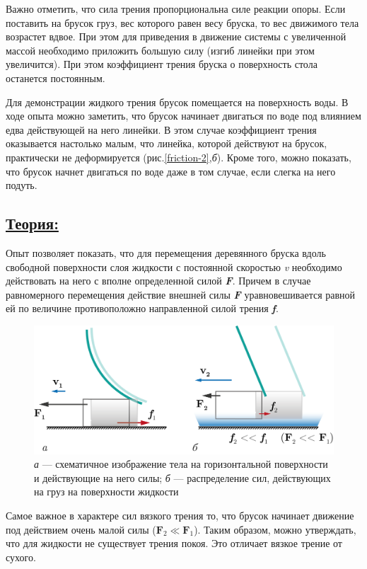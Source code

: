 \documentclass[14pt,a4paper,oneside]{extarticle}	%
\begin{document}
	Важно отметить, что сила трения пропорциональна силе реакции опоры.
	Если поставить на брусок груз, вес которого равен весу бруска, то вес движимого тела возрастет вдвое.
	При этом для приведения в движение системы с увеличенной массой необходимо приложить большую силу (изгиб линейки при этом увеличится).
	При этом коэффициент трения бруска о поверхность стола останется постоянным.
	


	Для демонстрации жидкого трения брусок помещается на поверхность воды.
	В ходе опыта можно заметить, что брусок начинает двигаться по воде под влиянием едва действующей на него линейки.
	В этом случае коэффициент трения оказывается настолько малым, что линейка, 
	которой действуют на брусок, практически не деформируется (рис.\ref{friction-2},\textit{б}).
	Кроме того, можно показать, что брусок начнет двигаться по воде даже в том случае, 
	если слегка на него подуть.
		
\subsection*{\underline{Теория:}}

Опыт позволяет показать, что для перемещения деревянного бруска вдоль свободной поверхности слоя жидкости с постоянной скоростью \textit{v} необходимо действовать на него с вполне определенной силой \textit{\textbf{F}}.
Причем в случае равномерного перемещения действие внешней силы \textit{\textbf{F}} уравновешивается равной ей по величине противоположно направленной силой трения \textit{\textbf{f}}.

	\begin{figure}[H] 
	\centering 	
	\includegraphics[width=0.75\linewidth]{friction-3.png}
	\caption{\textit{а} — схематичное изображение тела на горизонтальной поверхности и действующие на него силы; \textit{б} — распределение сил, действующих на груз на поверхности жидкости}
	\label{friction-3}
\end{figure}

Самое важное в характере сил вязкого трения то, что брусок начинает движение под действием очень малой силы ($ \textbf{F}_2 \ll \textbf{F}_1 $).
Таким образом, можно утверждать, что для жидкости не существует трения покоя. 
Это отличает вязкое трение от сухого.
	
\end{document}
